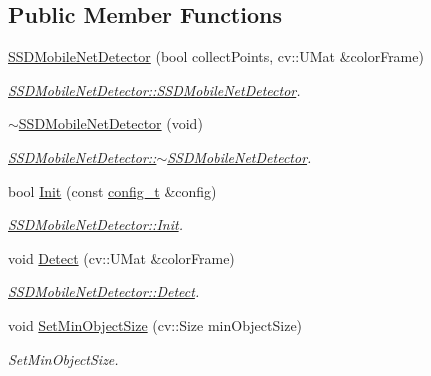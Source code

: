 \subsection*{Public Member Functions}
\begin{DoxyCompactItemize}
\item 
\mbox{\hyperlink{class_s_s_d_mobile_net_detector_a29de895fa6e8a3960837660460e23d41}{S\+S\+D\+Mobile\+Net\+Detector}} (bool collect\+Points, cv\+::\+U\+Mat \&color\+Frame)
\begin{DoxyCompactList}\small\item\em \mbox{\hyperlink{class_s_s_d_mobile_net_detector_a29de895fa6e8a3960837660460e23d41}{S\+S\+D\+Mobile\+Net\+Detector\+::\+S\+S\+D\+Mobile\+Net\+Detector}}. \end{DoxyCompactList}\item 
\mbox{\hyperlink{class_s_s_d_mobile_net_detector_aab4a87e950c5d0ea2631f8f7d521dc1c}{$\sim$\+S\+S\+D\+Mobile\+Net\+Detector}} (void)
\begin{DoxyCompactList}\small\item\em \mbox{\hyperlink{class_s_s_d_mobile_net_detector_aab4a87e950c5d0ea2631f8f7d521dc1c}{S\+S\+D\+Mobile\+Net\+Detector\+::$\sim$\+S\+S\+D\+Mobile\+Net\+Detector}}. \end{DoxyCompactList}\item 
bool \mbox{\hyperlink{class_s_s_d_mobile_net_detector_a2830cbf9b82b159c25fb2796b867eaef}{Init}} (const \mbox{\hyperlink{defines_8h_a81d657237a541d02f8eeefdd40191920}{config\+\_\+t}} \&config)
\begin{DoxyCompactList}\small\item\em \mbox{\hyperlink{class_s_s_d_mobile_net_detector_a2830cbf9b82b159c25fb2796b867eaef}{S\+S\+D\+Mobile\+Net\+Detector\+::\+Init}}. \end{DoxyCompactList}\item 
void \mbox{\hyperlink{class_s_s_d_mobile_net_detector_a6ac3fd479002779642ed185107d83dea}{Detect}} (cv\+::\+U\+Mat \&color\+Frame)
\begin{DoxyCompactList}\small\item\em \mbox{\hyperlink{class_s_s_d_mobile_net_detector_a6ac3fd479002779642ed185107d83dea}{S\+S\+D\+Mobile\+Net\+Detector\+::\+Detect}}. \end{DoxyCompactList}\item 
void \mbox{\hyperlink{class_base_detector_ab459f4e77cf1110cc1ee84027f0f2a03}{Set\+Min\+Object\+Size}} (cv\+::\+Size min\+Object\+Size)
\begin{DoxyCompactList}\small\item\em Set\+Min\+Object\+Size. \end{DoxyCompactList}\item 

\end{DoxyCompactItemize}
